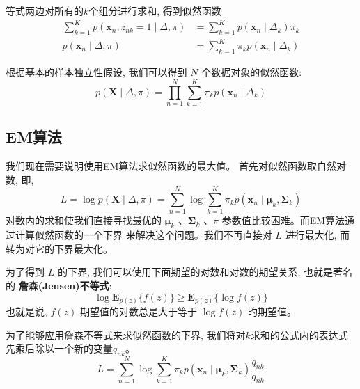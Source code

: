\documentclass[UTF8]{ctexart}
\numberwithin{equation}{section}
\begin{document}
等式两边对所有的$k$个组分进行求和, 得到似然函数
$$
\begin{aligned}
\sum_{k=1}^{K} p\left(\boldsymbol{x}_{n}, z_{n k}=1 \mid \Delta, \pi\right)&=\sum_{k=1}^{K} p\left(\boldsymbol{x}_{n} \mid \Delta_{k}\right) \pi_{k} \\
p\left(\boldsymbol{x}_{n} \mid \Delta, \pi\right)&=\sum_{k=1}^{K} \pi_{k} p\left(\boldsymbol{x}_{n} \mid \Delta_{k}\right) 
\end{aligned}
$$

根据基本的样本独立性假设, 我们可以得到 $N$ 个数据对象的似然函数:
\begin{equation}
p(\boldsymbol{X} \mid \Delta, \pi)=\prod_{n=1}^{N} \sum_{k=1}^{K} \pi_{k} p\left(\boldsymbol{x}_{n} \mid \Delta_{k}\right)  
\end{equation}

\subsection{EM算法}
我们现在需要说明使用EM算法求似然函数的最大值。
首先对似然函数取自然对数, 即,
\begin{equation}
L=\log p(\boldsymbol{X} \mid \Delta, \pi)=\sum_{n=1}^{N} \log \sum_{k=1}^{K} \pi_{k} p\left(\boldsymbol{x}_{n} \mid \boldsymbol{\mu}_{k}, \boldsymbol{\Sigma}_{k}\right) 
\end{equation}
对数内的求和使我们直接寻找最优的 
$\boldsymbol{\mu}_{k}$ 、$\boldsymbol{\Sigma}_{k}$
、$\pi$ 参数值比较困难。而EM算法通过计算似然函数的一个下界
来解决这个问题。我们不再直接对 $L$ 进行最大化, 而转为对它的下界最大化。

为了得到 $L$ 的下界, 我们可以使用下面期望的对数和对数的期望关系, 也就是著名的 
\textbf{詹森(Jensen)不等式}:
\begin{equation}
    \log \boldsymbol{E}_{p(z)}\{f(z)\} \geqslant \boldsymbol{E}_{p(z)}\{\log f(z)\}
\end{equation}
也就是说, $f(z)$ 期望值的对数总是大于等于 $\log f(z)$ 旳期望值。

为了能够应用詹森不等式来求似然函数的下界, 
我们将对$k$求和的公式内的表达式先乘后除以一个新的变量$q_{n k}$。
\begin{equation}
L=\sum_{n=1}^{N} \log \sum_{k=1}^{K} \pi_{k} p\left(\boldsymbol{x}_{n} \mid \boldsymbol{\mu}_{k}, \boldsymbol{\Sigma}_{k}\right) \frac{q_{n k}}{q_{n k}}   
\end{equation}
\end{document}

